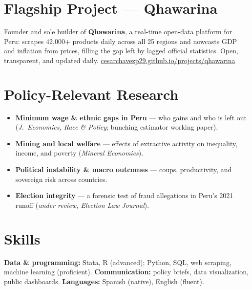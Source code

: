 \documentclass[10pt]{article}
\begin{document}
\section{Flagship Project --- Qhawarina}
Founder and sole builder of \textbf{Qhawarina}, a real-time open-data platform for Peru: scrapes 42{,}000+ products daily across all 25 regions and nowcasts GDP and inflation from prices, filling the gap left by lagged official statistics. Open, transparent, and updated daily. \href{https://cesarchavezp29.github.io/projects/qhawarina/}{cesarchavezp29.github.io/projects/qhawarina}

\section{Policy-Relevant Research}
\begin{itemize}
\item \textbf{Minimum wage \& ethnic gaps in Peru} --- who gains and who is left out (\textit{J.\ Economics, Race \& Policy}; bunching estimator working paper).
\item \textbf{Mining and local welfare} --- effects of extractive activity on inequality, income, and poverty (\textit{Mineral Economics}).
\item \textbf{Political instability \& macro outcomes} --- coups, productivity, and sovereign risk across countries.
\item \textbf{Election integrity} --- a forensic test of fraud allegations in Peru's 2021 runoff (\textit{under review, Election Law Journal}).
\end{itemize}

\section{Skills}
\textbf{Data \& programming:} Stata, R (advanced); Python, SQL, web scraping, machine learning (proficient). \quad
\textbf{Communication:} policy briefs, data visualization, public dashboards. \quad
\textbf{Languages:} Spanish (native), English (fluent).
\end{document}
